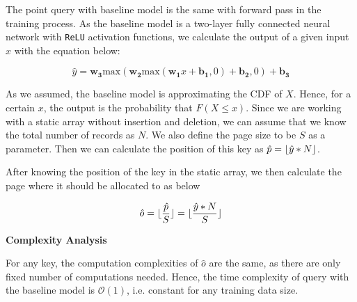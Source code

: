 The point query with baseline model is the same with forward pass in the training process. As the baseline model is a two-layer fully connected neural network with \texttt{ReLU} activation functions, we calculate the output of a given input $x$ with the equation below:

\begin{equation}
	\hat{y}=\boldsymbol{w_3}\text{max}(\boldsymbol{w_2}\text{max}(\boldsymbol{w_1}x+\boldsymbol{b_1},0)+\boldsymbol{b_2},0)+\boldsymbol{b_3}
\end{equation}

As we assumed, the baseline model is approximating the CDF of $X$. Hence, for a certain $x$, the output is the probability that $F(X\leq x)$. Since we are working with a static array without insertion and deletion, we can assume that we know the total number of records as $N$. We also define the page size to be $S$ as a parameter. Then we can calculate the position of this key as $\hat{p}=\lfloor\hat{y}* N\rfloor$.

After knowing the position of the key in the static array, we then calculate the page where it should be allocated to as below

\begin{equation}
	\hat{o}=\lfloor\frac{\hat{p}}{S}\rfloor=\lfloor\frac{\hat{y}*N}{S}\rfloor
\end{equation}

\noindent
\textbf{Complexity Analysis}

For any key, the computation complexities of $\hat{o}$ are the same, as there are only fixed number of computations needed. Hence, the time complexity of query with the baseline model is $\mathcal{O}(1)$, i.e. constant for any training data size.